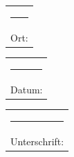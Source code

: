 \documentclass[
fontsize=12pt,
a4paper,  %
twoside,  %
bibliography=totoc,
headsepline,
cleardoublepage=empty,
parskip=half,
draft=false
]{scrbook}
\begin{document}
		\vspace{2cm}
		
		\hfill
		\begin{tabular}[t]{c}
			\rule{10em}{0.4pt}\\ Ort:
		\end{tabular}
		\hfill
		\begin{tabular}[t]{c}
			\rule{10em}{0.4pt}\\ Datum:
		\end{tabular}
		\hfill
		\begin{tabular}[t]{c}
			\rule{10em}{0.4pt}\\ Unterschrift:
		\end{tabular}
		\hfill
		\hfill\strut
		
		\pagestyle{empty}
		\renewcommand*{\chapterpagestyle}{empty}
		
	
\end{document}
